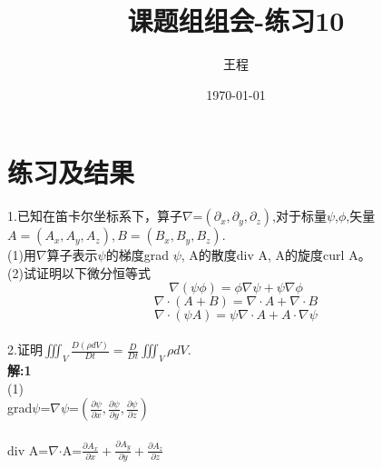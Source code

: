 \documentclass[a4paper,11pt,UTF8]{article}%
\theoremstyle{plain}
\begin{document}
	\title{\heiti 课题组组会-练习10}
	\author{王程 }
	\date{\today}
	\maketitle
	
	\section{练习及结果}
	1.已知在笛卡尔坐标系下，算子$\nabla$=$\left(\partial_x,\partial_y,\partial_z\right)$,对于标量$\psi$,$\phi$,矢量$A=\left(A_x,A_y,A_z\right),B=\left(B_x,B_y,B_z\right).$\\
	\indent (1)用$\nabla$算子表示$\psi$的梯度grad $\psi$, A的散度div A, A的旋度curl A。\\
	\indent (2)试证明以下微分恒等式\\
	$$\nabla\left(\psi \phi\right)=\phi\nabla \psi+\psi\nabla\phi$$
	$$\nabla\cdot \left(A+B\right)=\nabla\cdot A+\nabla\cdot B$$
	$$\nabla\cdot\left(\psi A\right)=\psi\nabla\cdot A+A\cdot\nabla\psi$$\\
	\indent 2.证明$\iiint_{V}\frac{D\left(\rho dV\right)}{Dt}=\frac{D}{Dt}\iiint_{V}\rho dV$.\\
	\clearpage
		\noindent \textbf{解:1}\\
		(1)\\
	\indent grad$\psi$=$\nabla$$\psi$=$\left(\frac{\partial\psi}{\partial x},\frac{\partial\psi}{\partial y},\frac{\partial\psi}{\partial z}\right)$\\
	~\\
	\indent div A=$\nabla$$\cdot$A=$\frac{\partial A_x}{\partial x}+\frac{\partial A_y}{\partial y}+\frac{\partial A_z}{\partial z}$\\
	~\\
\end{document}
